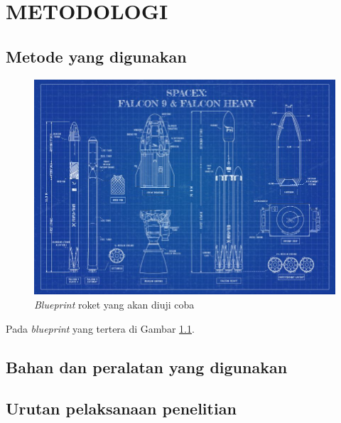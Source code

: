\chapter{METODOLOGI}


\section{Metode yang digunakan}

\lipsum[11]

\begin{figure} [ht] \centering
  \includegraphics[scale=0.45]{gambar/blueprint.jpg}
  \caption{\emph{Blueprint} roket yang akan diuji coba \parencite{SpaceXBlueprint}}
  \label{fig:Blueprint}
\end{figure}

Pada \emph{blueprint} yang tertera di Gambar \ref{fig:Blueprint}. \lipsum[12]

\section{Bahan dan peralatan yang digunakan}

\lipsum[13]
\lipsum[3]

\section{Urutan pelaksanaan penelitian}

